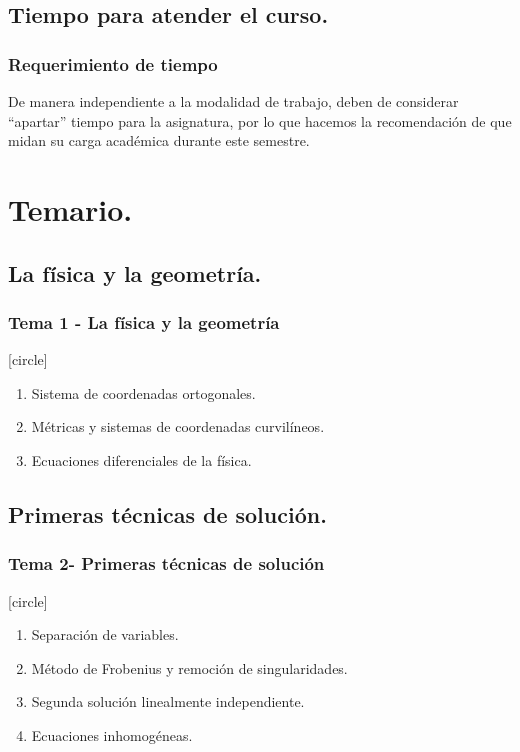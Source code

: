 \subsection{Tiempo para atender el curso.}
\begin{frame}
\frametitle{Requerimiento de tiempo}
De manera independiente a la modalidad de trabajo, deben de considerar \enquote{apartar} tiempo para la asignatura, por lo que hacemos la recomendación de que midan su carga académica durante este semestre.
\end{frame}
\section{Temario.}
\subsection{La física y la geometría.}
\begin{frame}
\frametitle{Tema 1 - La física y la geometría}
[circle]
\begin{enumerate}[<+->]
\item Sistema de coordenadas ortogonales.
\item Métricas y sistemas de coordenadas curvilíneos.
\item Ecuaciones diferenciales de la física.
\end{enumerate}
\end{frame}
\subsection{Primeras técnicas de solución.}
\begin{frame}
\frametitle{Tema 2- Primeras técnicas de solución}
[circle]
\begin{enumerate}[<+->]
\item Separación de variables.
\item Método de Frobenius y remoción de singularidades.
\item Segunda solución linealmente independiente.
\item Ecuaciones inhomogéneas.  
\end{enumerate}
\end{frame}
